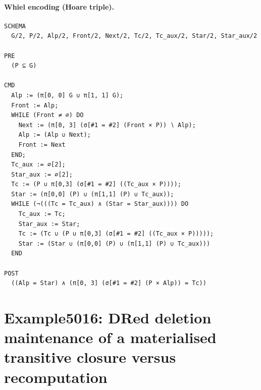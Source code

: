 \documentclass[10pt]{article}
\begin{document}
\paragraph{Whiel encoding (Hoare triple).}

\begin{Verbatim}[fontsize=\scriptsize,breaklines=true,breakanywhere=true,frame=single,framesep=1.5mm]
SCHEMA
  G/2, P/2, Alp/2, Front/2, Next/2, Tc/2, Tc_aux/2, Star/2, Star_aux/2

PRE
  (P ⊆ G) 

CMD
  Alp := (π[0, 0] G ∪ π[1, 1] G);
  Front := Alp;
  WHILE (Front ≠ ∅) DO
    Next := (π[0, 3] (σ[#1 = #2] (Front × P)) ∖ Alp);
    Alp := (Alp ∪ Next);
    Front := Next
  END;
  Tc_aux := ∅[2];
  Star_aux := ∅[2];
  Tc := (P ∪ π[0,3] (σ[#1 = #2] ((Tc_aux × P))));
  Star := (π[0,0] (P) ∪ (π[1,1] (P) ∪ Tc_aux));
  WHILE (¬(((Tc = Tc_aux) ∧ (Star = Star_aux)))) DO
    Tc_aux := Tc;
    Star_aux := Star;
    Tc := (Tc ∪ (P ∪ π[0,3] (σ[#1 = #2] ((Tc_aux × P)))));
    Star := (Star ∪ (π[0,0] (P) ∪ (π[1,1] (P) ∪ Tc_aux)))
  END

POST
  ((Alp = Star) ∧ (π[0, 3] (σ[#1 = #2] (P × Alp)) = Tc))
\end{Verbatim}

\Needspace{0.45\textheight}

\section{Example5016: DRed deletion maintenance of a materialised transitive closure versus recomputation}\label{case:Example5016}
\end{document}
